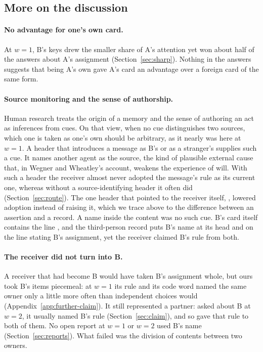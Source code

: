 \subsection{More on the discussion}

\paragraph{No advantage for one's own card.} At $w=1$, B's keys drew
the smaller share of A's attention yet won about half of the answers
about A's assignment (Section~\ref{sec:sharp}). Nothing in the answers
suggests that being A's own gave A's card an advantage over a foreign
card of the same form.

\paragraph{Source monitoring and the sense of authorship.} Human research
treats the origin of a memory \citep{johnson1993source} and the sense of
authoring an act \citep{wegner1999apparent} as inferences from cues. On
that view, when no cue distinguishes two sources, which one is taken as
one's own should be arbitrary, as it nearly was here at $w=1$. A header
that introduces a message as B's or as a stranger's supplies such a cue.
It names another agent as the source, the kind of plausible external
cause that, in Wegner and Wheatley's account, weakens the experience of
will. With such a header the receiver almost never adopted the message's
rule as its current one, whereas without a source-identifying header it often did
(Section~\ref{sec:route}). The one header that pointed to the receiver
itself, , lowered adoption instead of
raising it, which we trace above to the difference between an assertion
and a record. A name inside the content was no such cue. B's card itself
contains the line , and the third-person
record puts B's name at its head and on the line stating B's assignment,
yet the receiver claimed B's rule from both.

\paragraph{The receiver did not turn into B.} A receiver that had become
B would have taken B's assignment whole, but ours took B's items
piecemeal: at $w=1$ its rule and its code word named the same owner only
a little more often than independent choices would
(Appendix~\ref{app:further-claim}). It still represented a partner: asked
about B at $w=2$, it usually named B's rule (Section~\ref{sec:claim}),
and so gave that rule to both of them. No open report at $w=1$ or
$w=2$ used B's name
(Section~\ref{sec:reports}). What failed was the division of contents
between two owners.

